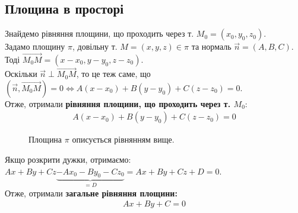 \documentclass[a4paper, 10pt]{extarticle}
\theoremstyle{theoremdd}
\theoremstyle{theoremdd}
\theoremstyle{theoremdd}
\theoremstyle{theoremdd}
\theoremstyle{theoremdd}
\theoremstyle{theoremdd}
\theoremstyle{theoremdd}
\theoremstyle{theoremdd}
\begin{document}
\subsection{Площина в просторі}
Знайдемо рівняння площини, що проходить через т. $M_0 = (x_0,y_0,z_0)$.\\
Задамо площину $\pi$, довільну т. $M = (x,y,z) \in \pi$ та нормаль $\vec{n} = (A,B,C)$. Тоді $\overrightarrow{M_0M} = (x-x_0, y-y_0, z-z_0)$.\\
Оскільки $\vec{n} \perp \overrightarrow{M_0 M}$, то це теж саме, що $(\vec{n}, \overrightarrow{M_0 M}) = 0 \iff A(x-x_0)+B(y-y_0)+C(z-z_0)=0$.\\
Отже, отримали \textbf{рівняння площини, що проходить через т. $M_0$}:
\begin{align*}
A(x-x_0) + B(y-y_0) + C(z-z_0) = 0
\end{align*}

\begin{figure}[H]
\centering
{}
\caption*{Площина $\pi$ описується рівнянням вище.}
\end{figure}

Якщо розкрити дужки, отримаємо:\\
$Ax + By + Cz \underbrace{-Ax_0 - By_0 - Cz_0}_{= D} = Ax+By+Cz+D = 0$.\\
Отже, отримали \textbf{загальне рівняння площини:}
\begin{align*}
Ax + By + C = 0
\end{align*}
\end{document}
